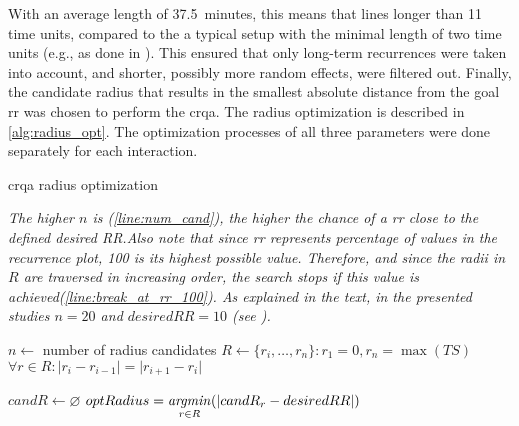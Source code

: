 With an average length of \SI{37.5}{minutes}, this means that lines longer than 11 time units, compared to the a typical setup with the minimal length of two time units (e.g., as done in \citet{Borrie2019syncing}).
This ensured that only long-term recurrences were taken into account, and shorter, possibly more random effects, were filtered out.
Finally, the candidate radius that results in the smallest absolute distance from the goal \ac{rr} was chosen to perform the \ac{crqa}.
The radius optimization is described in \cref{alg:radius_opt}.
The optimization processes of all three parameters were done separately for each interaction.
%
\begin{algorithm}[t]
	\caption{\acs{crqa} radius optimization}
	\label{alg:radius_opt}
	\algorithmcaption
		{\emph{The higher $n$ is (\cref{line:num_cand}), the higher the chance of a \ac{rr} close to the defined \emph{desired RR}.Also note that since \ac{rr} represents percentage of values in the recurrence plot, 100 is its highest possible value.
		Therefore, and since the radii in $R$ are traversed in increasing order, the search stops if this value is achieved(\cref{line:break_at_rr_100}).
		As explained in the text, in the presented studies $n = 20$ and $desiredRR = 10$ (see \citet{Coco2014crqa-r}).}}
	\DontPrintSemicolon
	
	
	$n \gets$ number of radius candidates \label{line:num_cand}\;
	$R \gets \{r_i, \ldots, r_n\} : r_1 = 0, r_n = \max(TS)$\;
	$\forall r \in R : \lvert r_i - r_{i-1} \rvert = \lvert r_{i+1} - r_i \rvert$ 
	
	$candR \gets \varnothing$\;
	$optRadius = \displaystyle\operatorname*{\mathit{argmin}}_{r \in R}(\lvert candR_r - desiredRR \rvert)$\;
\end{algorithm}

